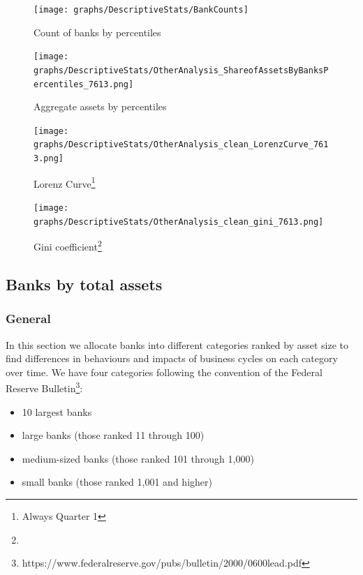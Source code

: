 \documentclass[12pt, a4paper]{article} %
\begin{document}
\begin{figure}[hbtp]
\centering
\caption{Count of banks by percentiles}
\texttt{[image: graphs/DescriptiveStats/BankCounts]}
\label{table:assetsByPercentiles}
\end{figure}


\begin{figure}[hbtp]
\centering
\caption{Aggregate assets by percentiles}
\texttt{[image: graphs/DescriptiveStats/OtherAnalysis\_ShareofAssetsByBanksPercentiles\_7613.png]}
\label{fig:assetsByPercentiles}
\end{figure}


\begin{figure}[hbtp]
\begin{minipage}{\textwidth}
\centering
\caption[1]{Lorenz Curve\footnote{Always Quarter 1} }
\texttt{[image: graphs/DescriptiveStats/OtherAnalysis\_clean\_LorenzCurve\_7613.png]}
\label{fig:lorenz}
\end{minipage}
\end{figure}


\begin{figure}[hbtp]
\begin{minipage}{\textwidth}
\centering
\caption[1]{Gini coefficient\footnote{} }
\texttt{[image: graphs/DescriptiveStats/OtherAnalysis\_clean\_gini\_7613.png]}
\label{fig:gini}
\end{minipage}
\end{figure}




\subsection{Banks by total assets}
\label{sec:banksByAssetSize}

\subsubsection{General}
In this section we allocate banks into different categories ranked by asset size to find differences in behaviours and impacts of business cycles on each category over time. We have four categories following the convention of the Federal Reserve Bulletin\footnote{https://www.federalreserve.gov/pubs/bulletin/2000/0600lead.pdf}:

\begin{itemize}
 \item 10 largest banks
 \item large banks (those ranked
  11 through 100)
 \item medium-sized banks (those ranked 101 through
 1,000)
 \item small banks (those ranked 1,001 and higher)
 \end{itemize} 
\end{document}
